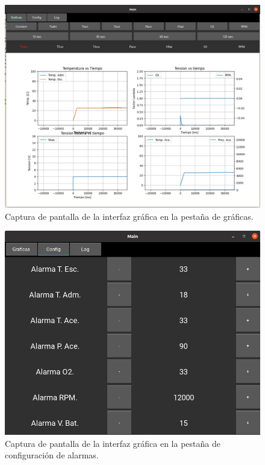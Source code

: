 \begin{figure}[htpb]
\centering
\includegraphics[width=.9\textwidth]{./Figures/gui.png}
\caption{Captura de pantalla de la interfaz gráfica en la pestaña de gráficas.}
\label{fig:gui}
\end{figure}

\begin{figure}[htpb]
\centering
\includegraphics[width=.9\textwidth]{./Figures/gui-config.png}
\caption{Captura de pantalla de la interfaz gráfica en la pestaña de configuración de alarmas.}
\label{fig:gui-config}
\end{figure}

